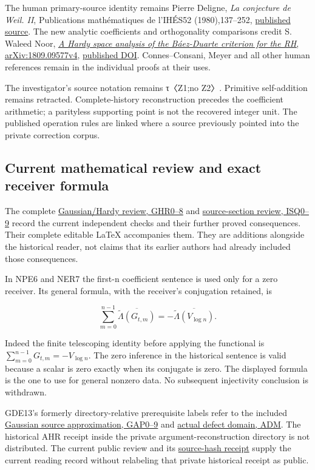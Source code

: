 \documentclass[
]{article}
\begin{document}
The human primary-source identity remains Pierre Deligne, \emph{La conjecture de Weil. II}, Publications mathématiques de l'IHÉS52 (1980),137--252, \href{https://numdam.org/item/PMIHES_1980__52__137_0/}{published source}. The new analytic coefficients and orthogonality comparisons credit S. Waleed Noor, \href{https://arxiv.org/abs/1809.09577v4}{\emph{A Hardy space analysis of the Báez-Duarte criterion for the RH}, arXiv:1809.09577v4}, \href{https://doi.org/10.1016/j.aim.2019.04.064}{published DOI}. Connes--Consani, Meyer and all other human references remain in the individual proofs at their uses.

The investigator's source notation remains τ〈Z1;no Z2〉. Primitive self-addition remains retracted. Complete-history reconstruction precedes the coefficient arithmetic; a parityless supporting point is not the recovered integer unit. The published operation rules are linked where a source previously pointed into the private correction corpus.

\subsection{Current mathematical review and exact receiver formula}\label{current-mathematical-review-and-exact-receiver-formula}

The complete \href{review/INDEPENDENT_GAUSSIAN_HARDY_REVIEW.md}{Gaussian/Hardy review, GHR0--8} and \href{review/INDEPENDENT_SOURCE_SECTION_REVIEW.md}{source-section review, ISQ0--9} record the current independent checks and their further proved consequences. Their complete editable LaTeX accompanies them. They are additions alongside the historical reader, not claims that its earlier authors had already included those consequences.

In NPE6 and NER7 the first-n coefficient sentence is used only for a zero receiver. Its general formula, with the receiver's conjugation retained, is

\[
\sum_{m=0}^{n-1}\overline{\widetilde\Lambda(G_{t,m})}
=-\overline{\widetilde\Lambda(V_{\log n})}.
\]

Indeed the finite telescoping identity before applying the functional is \(\sum_{m=0}^{n-1}G_{t,m}=-V_{\log n}\). The zero inference in the historical sentence is valid because a scalar is zero exactly when its conjugate is zero. The displayed formula is the one to use for general nonzero data. No subsequent injectivity conclusion is withdrawn.

GDE13's formerly directory-relative prerequisite labels refer to the included \href{GAUSSIAN_FULL_SOURCE_APPROXIMATION.md}{Gaussian source approximation, GAP0--9} and \href{ACTUAL_DEFECT_MULTIPLIER_DOMAIN.md}{actual defect domain, ADM}. The historical AHR receipt inside the private argument-reconstruction directory is not distributed. The current public review and its \href{review/PUBLIC_REVIEW_RECEIPT.json}{source-hash receipt} supply the current reading record without relabeling that private historical receipt as public.
\end{document}
